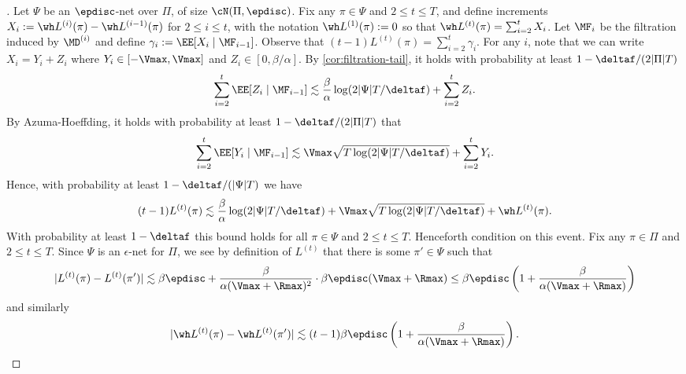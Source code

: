 \begin{proof}[]
Let $\Psi$ be an $\epdisc$-net over $\Pi$, of size $\cN(\Pi,\epdisc)$. Fix any $\pi \in \Psi$ and $2 \leq t \leq T$, and define increments $X_i := \wh L^{(i)}(\pi) - \wh L^{(i-1)}(\pi)$ for $2 \leq i \leq t$, with the notation $\wh L^{(1)}(\pi) := 0$ so that $\wh L^{(t)}(\pi) = \sum_{i=2}^t X_i$. Let $\MF_i$ be the filtration induced by $\MD^{(i)}$ and define $\gamma_i := \EE[X_i\mid \MF_{i-1}]$. Observe that $(t-1)L^{(t)}(\pi) = \sum_{i=2}^t \gamma_i$. For any $i$, note that we can write $X_i = Y_i + Z_i$ where $Y_i \in [-\Vmax,\Vmax]$ and $Z_i \in [0,\beta/\alpha]$. By \cref{cor:filtration-tail}, it holds with probability at least $1-\deltaf/(2|\Pi|T)$
\[\sum_{i=2}^t \EE[Z_i\mid \MF_{i-1}] \lesssim \frac{\beta}{\alpha} \log(2|\Psi|T/\deltaf) + \sum_{i=2}^t Z_i.\]
By Azuma-Hoeffding, it holds with probability at least $1-\deltaf/(2|\Pi|T)$ that
\[\sum_{i=2}^t \EE[Y_i\mid \MF_{i-1}] \lesssim \Vmax\sqrt{T\log(2|\Psi|T/\deltaf)} + \sum_{i=2}^t Y_i.\]
Hence, with probability at least $1-\deltaf/(|\Psi|T)$ we have
\[(t-1)L^{(t)}(\pi) \lesssim \frac{\beta}{\alpha} \log(2|\Psi|T/\deltaf) + \Vmax\sqrt{T\log(2|\Psi|T/\deltaf)} + \wh L^{(t)}(\pi).\]
With probability at least $1-\deltaf$ this bound holds for all $\pi \in\Psi$ and $2 \leq t \leq T$. Henceforth condition on this event. Fix any $\pi \in \Pi$ and $2 \leq t \leq T$. Since $\Psi$ is an $\epsilon$-net for $\Pi$, we see by definition of $L^{(t)}$ that there is some $\pi' \in \Psi$ such that 
\[|L^{(t)}(\pi) - L^{(t)}(\pi')| \lesssim \beta \epdisc + \frac{\beta}{\alpha(\Vmax+\Rmax)^2} \cdot \beta\epdisc (\Vmax+\Rmax) \leq \beta\epdisc\left(1 + \frac{\beta}{\alpha(\Vmax+\Rmax)}\right)\]
and similarly
\[|\wh L^{(t)}(\pi) - \wh L^{(t)}(\pi')| \lesssim (t-1)\beta\epdisc\left(1 + \frac{\beta}{\alpha(\Vmax+\Rmax)}\right).\]


\end{proof}
